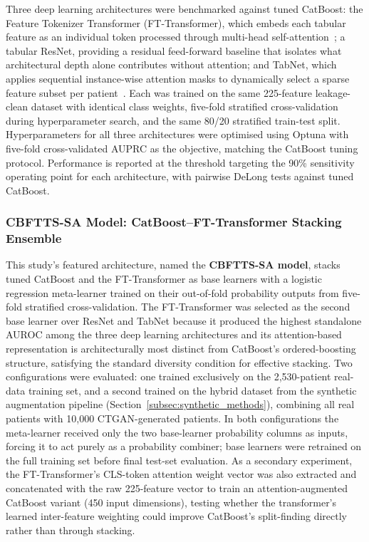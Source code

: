 \documentclass[final,3p,times]{elsarticle}
\begin{document}
Three deep learning architectures were benchmarked against tuned
CatBoost: the Feature Tokenizer Transformer (FT-Transformer), which
embeds each tabular feature as an individual token processed
through multi-head self-attention~\cite{gorishniy2021}; a tabular
ResNet, providing a residual feed-forward baseline that isolates
what architectural depth alone contributes without attention; and
TabNet, which applies sequential instance-wise attention masks to
dynamically select a sparse feature subset per patient~\cite{arik2021}.
Each was trained on the same 225-feature leakage-clean dataset with
identical class weights, five-fold stratified cross-validation
during hyperparameter search, and the same 80/20 stratified
train-test split. Hyperparameters for all three architectures were
optimised using Optuna with five-fold cross-validated AUPRC as the
objective, matching the CatBoost tuning protocol. Performance is
reported at the threshold targeting the 90\% sensitivity operating
point for each architecture, with pairwise DeLong tests against
tuned CatBoost.

\subsubsection{CBFTTS-SA Model: CatBoost--FT-Transformer Stacking Ensemble}
\label{subsec:stacking_methods}

This study's featured architecture, named the \textbf{CBFTTS-SA model},
stacks tuned CatBoost and the FT-Transformer as base learners with a
logistic regression meta-learner trained on their out-of-fold
probability outputs from five-fold stratified cross-validation. The
FT-Transformer was selected as the second base learner over ResNet
and TabNet because it produced the highest standalone AUROC among
the three deep learning architectures and its attention-based
representation is architecturally most distinct from CatBoost's
ordered-boosting structure, satisfying the standard diversity
condition for effective stacking. Two configurations were evaluated:
one trained exclusively on the 2,530-patient real-data training set,
and a second trained on the hybrid dataset from the synthetic
augmentation pipeline (Section~\ref{subsec:synthetic_methods}),
combining all real patients with 10,000 CTGAN-generated patients. In
both configurations the meta-learner received only the two
base-learner probability columns as inputs, forcing it to act purely
as a probability combiner; base learners were retrained on the full
training set before final test-set evaluation. As a secondary
experiment, the FT-Transformer's CLS-token attention weight vector
was also extracted and concatenated with the raw 225-feature vector
to train an attention-augmented CatBoost variant (450 input
dimensions), testing whether the transformer's learned inter-feature
weighting could improve CatBoost's split-finding directly rather
than through stacking.
\end{document}
